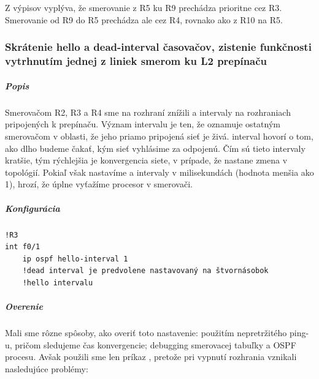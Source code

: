 \documentclass[12pt,twoside,a4paper]{article}
\begin{document}
\subparagraph{}
Z výpisov vyplýva, že smerovanie z R5 ku R9 prechádza prioritne cez R3. Smerovanie od R9 do R5 prechádza ale cez R4, rovnako ako z R10 na R5.


\subsubsection*{Skrátenie hello a dead-interval časovačov, zistenie funkčnosti vytrhnutím jednej z liniek smerom ku L2 prepínaču}

\subparagraph{Popis}
\subparagraph{}
Smerovačom R2, R3 a R4 sme na rozhraní  znížili  a  intervaly na rozhraniach pripojených k prepínaču. Význam  intervalu je ten, že oznamuje ostatným smerovačom v oblasti, že jeho priamo pripojená sieť je živá.  interval hovorí o tom, ako dlho budeme čakať, kým sieť vyhlásime za odpojenú. Čím sú tieto intervaly kratšie, tým rýchlejšia je konvergencia siete, v prípade, že nastane zmena v topológií. Pokiaľ však nastavíme  a  intervaly v milisekundách (hodnota menšia ako 1), hrozí, že úplne vyťažíme procesor v smerovači.

\subparagraph{Konfigurácia}
\noindent
{\selectfont
\begin{small}
\begin{verbatim}
!R3
int f0/1
    ip ospf hello-interval 1
    !dead interval je predvolene nastavovaný na štvornásobok
    !hello intervalu

\end{verbatim}
\end{small}
}

\subparagraph{Overenie}
\subparagraph{}
Mali sme rôzne spôsoby, ako overiť toto nastavenie: použitím nepretržitého ping-u, pričom sledujeme čas konvergencie; debugging smerovacej tabuľky a OSPF procesu. Avšak použili sme len príkaz , pretože pri vypnutí rozhrania  vznikali nasledujúce problémy:
\end{document}
